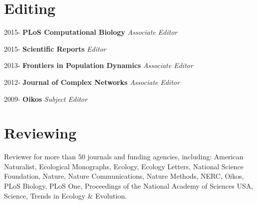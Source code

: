\documentclass[letterpaper]{article}
\begin{document}
\nocite{*} %

\renewcommand\refname{Publications}


\section*{Editing}
\begin{CV}[2]{-0.5ex}
\item[2015-] \textbf{PLoS Computational Biology} \textit{Associate Editor}

\item[2015-] \textbf{Scientific Reports} \textit{Editor}

\item[2013-] \textbf{Frontiers in Population Dynamics} \textit{Associate Editor}

\item[2012-] \textbf{Journal of Complex Networks} \textit{Associate Editor}

\item[2009-] \textbf{Oikos} \textit{Subject Editor}
\end{CV}

\section*{Reviewing}
Reviewer for more than 50 journals and funding agencies, including:
American Naturalist, Ecological Monographs,
Ecology, Ecology Letters, National Science Foundation, Nature, Nature
Communications, Nature Methods, NERC, Oikos, PLoS Biology, PLoS One,
Proceedings of the National Academy of Sciences USA, Science, Trends in Ecology \&
Evolution.
\end{document}
